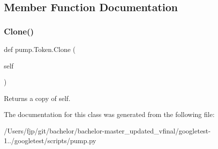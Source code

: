 \subsection{Member Function Documentation}
\mbox{\label{classpump_1_1_token_abc0f2d2a0bcad953f5fc85a4e52076eb}} 
\subsubsection{\texorpdfstring{Clone()}{Clone()}}
{\footnotesize\ttfamily def pump.\+Token.\+Clone (\begin{DoxyParamCaption}\item[{}]{self }\end{DoxyParamCaption})}

\begin{DoxyVerb}Returns a copy of self.\end{DoxyVerb}
 

The documentation for this class was generated from the following file\+:\begin{DoxyCompactItemize}
\item 
/\+Users/fjp/git/bachelor/bachelor-\/master\+\_\+updated\+\_\+vfinal/googletest-\/1../googletest/scripts/pump.\+py\end{DoxyCompactItemize}
